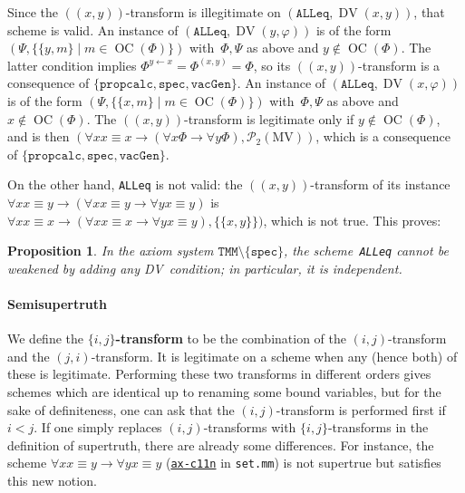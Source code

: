 \documentclass[11pt]{article}
\newcommand{\pp}[2]{(\!( #1 , #2 )\!)}
\newcommand*{\define}[1]{\textbf{#1}}%
\renewcommand*{\phi}{\varphi}
\newcommand*{\calP}{\mathcal{P}}
\newcommand*{\MV}{\mathrm{MV}}
\DeclareMathOperator{\DV}{DV}
\DeclareMathOperator{\OC}{OC}
\theoremstyle{plain}
\newtheorem{proposition}[theorem]{Proposition}
\theoremstyle{definition}
\theoremstyle{remark}
\begin{document}
Since the $\pp{x}{y}$-transform is illegitimate on $(\texttt{ALLeq}, \DV(x, y))$, that scheme is valid.
An instance of $(\texttt{ALLeq}, \DV(y, \phi))$ is of the form
$(\Psi, \{ \{y, m \} \mid m \in \OC(\Phi) \})$ with~$\Phi, \Psi$ as above and $y \notin \OC(\Phi)$.
The latter condition implies $\Phi^{y \leftarrow x} = \Phi^{(x,y)} = \Phi$, so its $\pp{x}{y}$-transform
is a consequence of $\{ \texttt{propcalc}, \texttt{spec}, \texttt{vacGen}\}$.
An instance of $(\texttt{ALLeq}, \DV(x, \phi))$ is of the form
$(\Psi, \{ \{x, m \} \mid m \in \OC(\Phi) \})$ with~$\Phi, \Psi$ as above and $x \notin \OC(\Phi)$.
The $\pp{x}{y}$-transform is legitimate only if $y \notin \OC(\Phi)$, and is then
$(\forall x x \equiv x \to (\forall x \Phi \to \forall y \Phi), \calP_2(\MV))$, which is a
consequence of $\{ \texttt{propcalc}, \texttt{spec}, \texttt{vacGen}\}$.

On the other hand, \texttt{ALLeq} is not valid: the $\pp{x}{y}$-transform of its instance
$\forall x x \equiv y \to (\forall x x \equiv y \to \forall y x \equiv y)$ is
$\forall x x \equiv x \to (\forall x x \equiv x \to \forall y x \equiv y), \{\{x, y\}\})$,
which is not true.
This proves:

\begin{proposition}
\label{prop:ALLeq}
In the axiom system $\texttt{TMM} \setminus \{\texttt{spec} \}$, the scheme~\texttt{ALLeq} cannot
be weakened by adding any DV~condition;
in particular, it is independent.
\end{proposition}


\paragraph{Semisupertruth}

We define the \define{$\{i, j\}$-transform} to be the combination of the $(i, j)$-transform
and the $(j, i)$-transform.
It is legitimate on a scheme when any (hence both) of these is legitimate.
Performing these two transforms in different orders gives schemes which are identical up to
renaming some bound variables, but for the sake of definiteness, one can ask that the
$(i, j)$-transform is performed first if $i < j$.
If one simply replaces $(i, j)$-transforms with $\{i, j\}$-transforms in the definition of
supertruth, there are already some differences.
For instance, the scheme $\forall x x \equiv y \to \forall y x \equiv y$
(\href{https://us.metamath.org/mpeuni/ax-c11n.html}{\texttt{ax-c11n}} in \texttt{set.mm}) is not
supertrue but satisfies this new notion.
\end{document}
